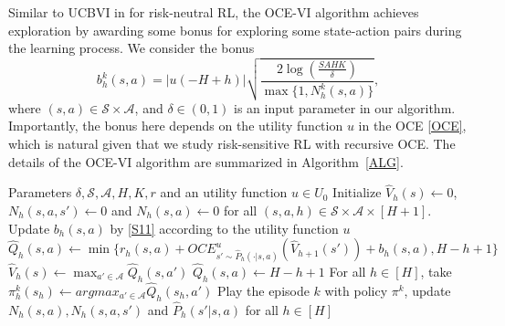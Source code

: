 \documentclass[11pt]{article}
\newcommand{\1}{\mathbbm{1}}
\begin{document}
Similar to UCBVI in \cite{azar2017minimax} for risk-neutral RL, the OCE-VI algorithm achieves exploration by awarding some bonus for exploring some state-action pairs during the learning process. We consider the bonus
\begin{equation}\label{S11}
b_h^k(s,a)=\vert u(-H+h)\vert\sqrt{\frac{2\log\left (\frac{SAHK}{\delta}\right )}{\max\{1,N^k_h(s,a)\}}},
\end{equation}
where $(s,a)\in \mathcal{S}\times\mathcal{A}$, and $\delta\in (0,1)$ is an input parameter in our algorithm. Importantly, the bonus here depends on the utility function $u$ in the OCE \eqref{OCE}, which is natural given that we study risk-sensitive RL with recursive OCE. 
The details of the OCE-VI algorithm are summarized in Algorithm~\ref{ALG}. 

\begin{algorithm*}[tb]
   \caption{The OCE-VI Algorithm}
   \label{ALG}
\begin{algorithmic}
    Parameters $\delta,\mathcal{S},\mathcal{A},H,K,r$ and an utility function $u \in U_0$
   \STATE Initialize $\hat{V}_{h}(s)\gets 0$, $N_h(s,a,s')\gets 0$ and $N_h(s,a)\gets 0$ for all $(s,a,h)\in\mathcal{S}\times\mathcal{A}\times [H+1]$.
   \STATE Update $b_h(s,a)$ by \eqref{S11} according to the utility function $u$
   \STATE$\hat{Q}_h(s,a)\gets \min{\{r_h(s,a)+OCE^{u}_{s'\sim \hat{P}_h(\cdot\vert s,a)}(\hat{V}_{h+1}(s'))+b_h(s,a),H-h+1\}}$
   \STATE $\hat{V}_h(s)\gets \max_{a'\in \mathcal{A}}\hat{Q}_h(s,a')$
   \ELSE
   \STATE $\hat{Q}_h(s,a)\gets H-h+1$
   \ENDIF
   \ENDFOR
   \ENDFOR
   \STATE For all $h\in [H]$, take $\pi^k_h(s_h)\gets argmax_{a'\in \mathcal{A}}\hat{Q}_h(s_h,a')$
   \STATE Play the episode $k$ with policy $\pi^k$, update $N_h(s,a),N_h(s,a,s')$ and $\hat{P}_h(s'\vert s,a)$ for all $h\in [H]$
   \ENDFOR
\end{algorithmic}
\end{algorithm*}
\end{document}
